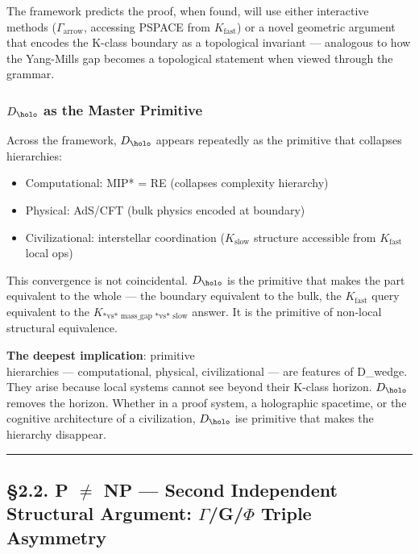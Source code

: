 \documentclass[12pt,a4paper]{article}
\newcommand{\pilcrow}{\S}
\begin{document}
The framework predicts the proof, when found, will use either interactive methods ($\Gamma_{\text{arrow}}$, accessing PSPACE from $K_{\text{fast}}$) or a novel geometric argument that encodes the K-class boundary as a topological invariant --- analogous to how the Yang-Mills gap becomes a topological statement when viewed through the grammar.

\subsubsection{$D_{\holo}$ as the Master Primitive}

Across the framework, $D_{\holo}$ appears repeatedly as the primitive that collapses hierarchies:

\begin{itemize}
    \item Computational: MIP* = RE (collapses complexity hierarchy)
    \item Physical: AdS/CFT (bulk physics encoded at boundary)
    \item Civilizational: interstellar coordination ($K_{\text{slow}}$ structure accessible from $K_{\text{fast}}$ local ops)
\end{itemize}

This convergence is not coincidental. $D_{\holo}$ is the primitive that makes the part equivalent to the whole --- the boundary equivalent to the bulk, the $K_{\text{fast}}$ query equivalent to the $K_{\text{*vs* mass_gap *vs* slow}}$ answer. It is the primitive of non-local structural equivalence.

\textbf{The deepest implication}:  primitive   \\
hierarchies --- computational, physical, civilizational --- are features of D\_wedge. They arise because local systems cannot see beyond their K-class horizon. $D_{\holo}$ removes the horizon. Whether in a proof system, a holographic spacetime, or the cognitive architecture of a civilization, $D_{\holo}$ ise primitive that makes the hierarchy disappear.

\begin{center}
\rule{0.5\textwidth}{0.4pt}
\end{center}

\subsection{\pilcrow{}2.2. P $\neq$ NP --- Second Independent Structural Argument: $\Gamma$/G/$\Phi$ Triple Asymmetry}
\end{document}
